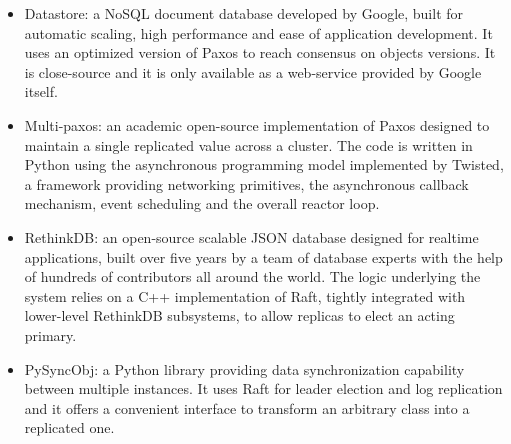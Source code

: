 \begin{itemize}
    \item Datastore: a NoSQL document database developed by Google, built for automatic scaling, high performance and ease of application development. It uses an optimized version of Paxos to reach consensus on objects versions. It is close-source and it is only available as a web-service provided by Google itself.
    \item Multi-paxos: an academic open-source implementation of Paxos designed to maintain a single replicated value across a cluster. The code is written in Python using the asynchronous programming model implemented by Twisted, a framework providing networking primitives, the asynchronous callback mechanism, event scheduling and the overall reactor loop.
    \item RethinkDB: an open-source scalable JSON database designed for realtime applications, built over five years by a team of database experts with the help of hundreds of contributors all around the world. The logic underlying the system relies on a C++ implementation of Raft, tightly integrated with lower-level RethinkDB subsystems, to allow replicas to elect an acting primary. 
    \item PySyncObj: a Python library providing data synchronization capability between multiple instances. It uses Raft for leader election and log replication and it offers a convenient interface to transform an arbitrary class into a replicated one.
\end{itemize}